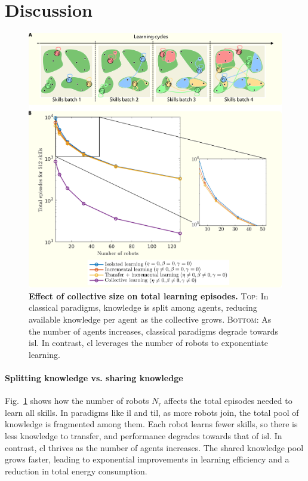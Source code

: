 \documentclass[12pt]{article}
\begin{document}
\section*{Discussion}\label{sec:discussion_revised}
\begin{figure}[t!]
	\centering
	\includegraphics[width=16cm]{learning_paradigms_and_size_of_collective.png}
	\caption[] {\label{fig:learning_paradigms_and_size_of_collective_revised} \textbf{Effect of collective size on total learning episodes.} {\textsc{Top}: In classical paradigms, knowledge is split among agents, reducing available knowledge per agent as the collective grows. \textsc{Bottom}: As the number of agents increases, classical paradigms degrade towards \acl{isl}. In contrast, \acl{cl} leverages the number of robots to exponentiate learning.}}
\end{figure}

\paragraph*{Splitting knowledge vs. sharing knowledge}
Fig.~\ref{fig:learning_paradigms_and_size_of_collective_revised} shows how the number of robots $N_\mathrm{r}$ affects the total episodes needed to learn all skills. In paradigms like \ac{il} and \ac{til}, as more robots join, the total pool of knowledge is fragmented among them. Each robot learns fewer skills, so there is less knowledge to transfer, and performance degrades towards that of \ac{isl}. In contrast, \ac{cl} thrives as the number of agents increases. The shared knowledge pool grows faster, leading to exponential improvements in learning efficiency and a reduction in total energy consumption.
\end{document}
